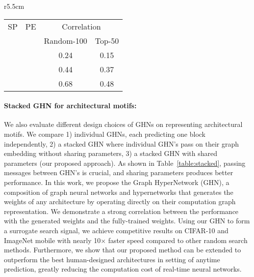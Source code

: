 \documentclass{article} %
\newcommand{\cmark}{\ding{51}}%
\newcommand{\xmark}{\ding{55}}%
\begin{document}
\begin{wraptable}[8]{r}{5.5cm}
\footnotesize
\vspace{-0.4cm}
\begin{center}
\begin{tabular}{ c c c c} 
SP & PE & \multicolumn{2}{c}{Correlation}    \\ 
 &&  Random-100 & Top-50   \\ 
\hline
\xmark & \xmark & 0.24 & 0.15\\
\xmark & \cmark  &  0.44 & 0.37\\
\cmark & \cmark  & 0.68 & 0.48 
\end{tabular}
\end{center}
\vspace{-0.1in}
\caption{Stacked GHN Correlation. SP denotes sharing parameters and PE denotes passing embeddings}
\label{table:stacked}
\end{wraptable}\vspace{-0.25cm}\paragraph{Stacked GHN for architectural motifs:}
We also evaluate different design choices of GHNs on representing architectural motifs. We compare
1) individual GHNs, each predicting one block independently, 
2) a stacked GHN where individual GHN's
   pass on their graph embedding without sharing parameters, 
3) a stacked GHN with shared parameters (our proposed approach). 
As shown in Table~\ref{table:stacked},  passing messages between GHN's is crucial, and sharing parameters produces better performance.
In this work, we propose the Graph HyperNetwork (GHN), a composition of graph neural networks and
hypernetworks that generates the weights of any architecture by operating directly on their
computation graph representation. We demonstrate a strong correlation between the performance with
the generated weights and the fully-trained weights. Using our GHN to form a surrogate search
signal, we achieve competitive results on CIFAR-10 and ImageNet mobile with nearly 10$\times$ faster
speed compared to other random search methods. Furthermore, we show that our proposed method can be
extended to outperform the best human-designed architectures in setting of anytime prediction,
greatly reducing the computation cost of real-time neural networks.
\end{document}
